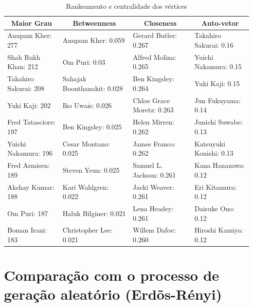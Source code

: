 \begin{table}[h]
\footnotesize
\centering

\caption{Rankeamento e centralidade dos vértices} %
\begin{tabular}{|m{3.5cm}|m{3.5cm}|m{3.5cm}| m{3.5cm}|}

\hline
\multicolumn{1}{|c|}{\textbf{Maior Grau}} & \multicolumn{1}{c|}{\textbf{Betweenness}} & \multicolumn{1}{c|}{\textbf{Closeness}} & \multicolumn{1}{c|}{\textbf{Auto-vetor}} \\
\hline


Anupam Kher: 277 & Anupam Kher: 0.059 & Gerard Butler: 0.267
 & Takahiro Sakurai: 0.16\\
\hline

Shah Rukh Khan: 212 & Om Puri: 0.03 & Alfred Molina: 0.265 & Yuichi Nakamura: 0.15\\
\hline

Takahiro Sakurai: 208 & Sahajak Boonthanakit: 0.028 & Ben Kingsley: 0.264 & Yuki Kaji: 0.15\\
\hline

Yuki Kaji: 202 & Iko Uwais: 0.026 & Chloe Grace Moretz: 0.263 & Jun Fukuyama: 0.14\\
\hline

Fred Tatasciore: 197 & Ben Kingsley: 0.025 & Helen Mirren: 0.262 & Junichi Suwabe: 0.13\\
\hline

Yuichi Nakamura: 196 & Cesar Montano: 0.025 & James Franco: 0.262 & Katsuyuki Konishi: 0.13\\
\hline

Fred Armisen: 189 & Steven Yeun: 0.025 & Samuel L. Jackson: 0.261 & Kana Hanazawa: 0.12\\
\hline

Akshay Kumar: 188 & Kari Wahlgren: 0.022 & Jacki Weaver: 0.261 & Eri Kitamura: 0.12 \\
\hline

Om Puri: 187 & Haluk Bilginer: 0.021 & Lena Headey: 0.261 & Daisuke Ono:  0.12\\
\hline

Boman Irani: 183 & Christopher Lee: 0.021 & Willem Dafoe: 0.260 & Hiroshi Kamiya: 0.12\\

\hline
\end{tabular}
\label{tab:rankeamento vertices}
\end{table}



\section{Comparação com o processo de geração aleatório (Erdõs-Rényi)}

